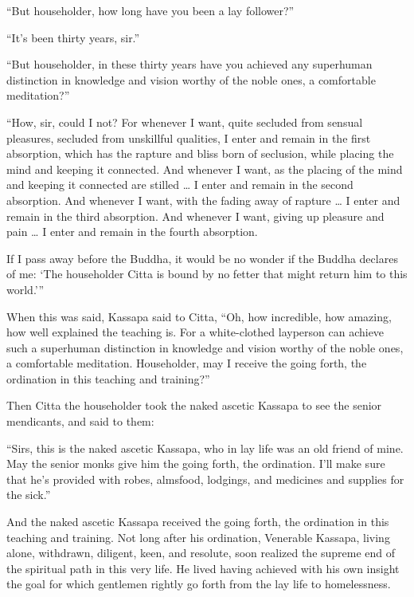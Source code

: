 \documentclass[12pt,openany]{book}%
\begin{document}
“But householder, how long have you been a lay follower?” 

“It’s been thirty years, sir.” 

“But householder, in these thirty years have you achieved any superhuman distinction in knowledge and vision worthy of the noble ones, a comfortable meditation?” 

“How, sir, could I not? For whenever I want, quite secluded from sensual pleasures, secluded from unskillful qualities, I enter and remain in the first absorption, which has the rapture and bliss born of seclusion, while placing the mind and keeping it connected. And whenever I want, as the placing of the mind and keeping it connected are stilled … I enter and remain in the second absorption. And whenever I want, with the fading away of rapture … I enter and remain in the third absorption. And whenever I want, giving up pleasure and pain … I enter and remain in the fourth absorption. 

If I pass away before the Buddha, it would be no wonder if the Buddha declares of me: ‘The householder Citta is bound by no fetter that might return him to this world.’” 

When this was said, Kassapa said to Citta, “Oh, how incredible, how amazing, how well explained the teaching is. For a white-clothed layperson can achieve such a superhuman distinction in knowledge and vision worthy of the noble ones, a comfortable meditation. Householder, may I receive the going forth, the ordination in this teaching and training?” 

Then Citta the householder took the naked ascetic Kassapa to see the senior mendicants, and said to them: 

“Sirs, this is the naked ascetic Kassapa, who in lay life was an old friend of mine. May the senior monks give him the going forth, the ordination. I’ll make sure that he’s provided with robes, almsfood, lodgings, and medicines and supplies for the sick.” 

And the naked ascetic Kassapa received the going forth, the ordination in this teaching and training. Not long after his ordination, Venerable Kassapa, living alone, withdrawn, diligent, keen, and resolute, soon realized the supreme end of the spiritual path in this very life. He lived having achieved with his own insight the goal for which gentlemen rightly go forth from the lay life to homelessness. 
\end{document}
